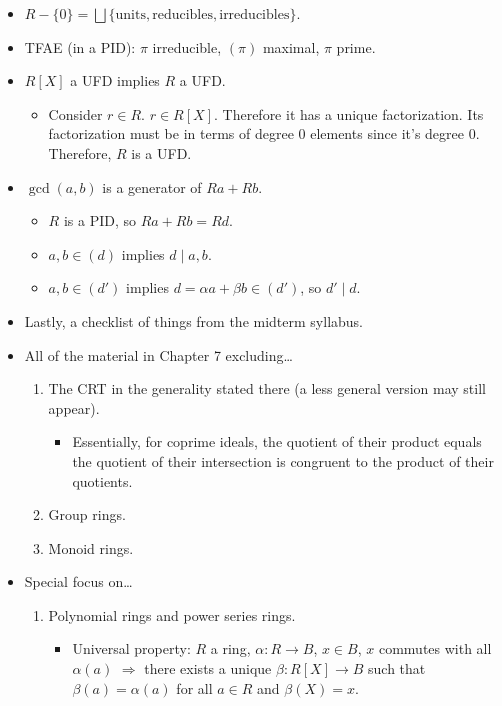 \documentclass[../notes.tex]{subfiles}
\begin{document}
\begin{itemize}
    \item $R-\{0\}=\bigsqcup\{\text{units},\text{reducibles},\text{irreducibles}\}$.
    \item TFAE (in a PID): $\pi$ irreducible, $(\pi)$ maximal, $\pi$ prime.
    \item $R[X]$ a UFD implies $R$ a UFD.
    \begin{itemize}
        \item Consider $r\in R$. $r\in R[X]$. Therefore it has a unique factorization. Its factorization must be in terms of degree 0 elements since it's degree 0. Therefore, $R$ is a UFD.
    \end{itemize}
    \item $\gcd(a,b)$ is a generator of $Ra+Rb$.
    \begin{itemize}
        \item $R$ is a PID, so $Ra+Rb=Rd$.
        \item $a,b\in(d)$ implies $d\mid a,b$.
        \item $a,b\in(d')$ implies $d=\alpha a+\beta b\in(d')$, so $d'\mid d$.
    \end{itemize}
    \item Lastly, a checklist of things from the midterm syllabus.
    \item All of the material in Chapter 7 excluding\dots
    \begin{enumerate}
        \item The CRT in the generality stated there (a less general version may still appear).
        \begin{itemize}
            \item Essentially, for coprime ideals, the quotient of their product equals the quotient of their intersection is congruent to the product of their quotients.
        \end{itemize}
        \item Group rings.
        \item Monoid rings.
    \end{enumerate}
    \item Special focus on\dots
    \begin{enumerate}
        \item Polynomial rings and power series rings.
        \begin{itemize}
            \item Universal property: $R$ a ring, $\alpha:R\to B$, $x\in B$, $x$ commutes with all $\alpha(a)$ $\Rightarrow$ there exists a unique $\beta:R[X]\to B$ such that $\beta(a)=\alpha(a)$ for all $a\in R$ and $\beta(X)=x$.

\end{itemize}
\end{enumerate}
\end{itemize}
\end{document}
